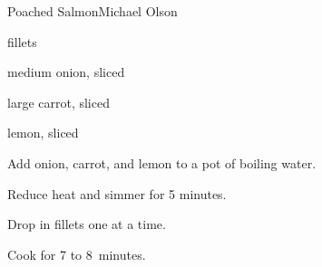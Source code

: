 \begin{recipe}{Poached Salmon}{Michael Olson}{}

\begin{ingredients}
\item {}  fillets
\item medium onion, sliced
\item large carrot, sliced
\item lemon, sliced
\end{ingredients}

\begin{directions}
\item Add onion, carrot, and lemon to a pot of boiling water.
\item Reduce heat and simmer for 5 minutes.
\item Drop in fillets one at a time.
\item Cook for 7 to 8~minutes.
\end{directions}

\end{recipe}
